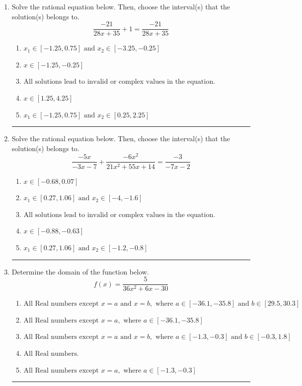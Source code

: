 \documentclass[14pt]{extbook}
\newcommand{\litem}[1]{\item#1\hspace*{-1cm}\rule{\textwidth}{0.4pt}}
\begin{document}
\begin{enumerate}
{\begin{enumerate}[label=\Alph*.]
\end{enumerate} }
\litem{
Solve the rational equation below. Then, choose the interval(s) that the solution(s) belongs to.\[ \frac{-21}{28x + 35} + 1 = \frac{-21}{28x + 35} \]\begin{enumerate}[label=\Alph*.]
\item \( x_1 \in [-1.25, 0.75] \text{ and } x_2 \in [-3.25,-0.25] \)
\item \( x \in [-1.25,-0.25] \)
\item \( \text{All solutions lead to invalid or complex values in the equation.} \)
\item \( x \in [1.25,4.25] \)
\item \( x_1 \in [-1.25, 0.75] \text{ and } x_2 \in [0.25,2.25] \)

\end{enumerate} }
\litem{
Solve the rational equation below. Then, choose the interval(s) that the solution(s) belongs to.\[ \frac{-5x}{-3x -7} + \frac{-6x^{2}}{21x^{2} +55 x + 14} = \frac{-3}{-7x -2} \]\begin{enumerate}[label=\Alph*.]
\item \( x \in [-0.68,0.07] \)
\item \( x_1 \in [0.27, 1.06] \text{ and } x_2 \in [-4,-1.6] \)
\item \( \text{All solutions lead to invalid or complex values in the equation.} \)
\item \( x \in [-0.88,-0.63] \)
\item \( x_1 \in [0.27, 1.06] \text{ and } x_2 \in [-1.2,-0.8] \)

\end{enumerate} }
\litem{
Determine the domain of the function below.\[ f(x) = \frac{5}{36x^{2} +6 x -30} \]\begin{enumerate}[label=\Alph*.]
\item \( \text{All Real numbers except } x = a \text{ and } x = b, \text{ where } a \in [-36.1, -35.8] \text{ and } b \in [29.5, 30.3] \)
\item \( \text{All Real numbers except } x = a, \text{ where } a \in [-36.1, -35.8] \)
\item \( \text{All Real numbers except } x = a \text{ and } x = b, \text{ where } a \in [-1.3, -0.3] \text{ and } b \in [-0.3, 1.8] \)
\item \( \text{All Real numbers.} \)
\item \( \text{All Real numbers except } x = a, \text{ where } a \in [-1.3, -0.3] \)

\end{enumerate} }
\end{enumerate}
\end{document}
